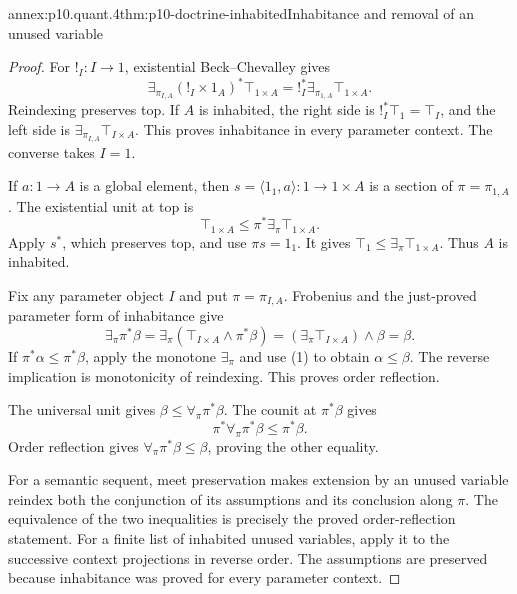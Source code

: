 \begin{annexitem}{annex:p10.quant.4}{thm:p10-doctrine-inhabited}{Inhabitance and removal of an unused variable}
\begin{proof}
For \(!_I:I\to1\), existential Beck--Chevalley gives
\[
 \exists_{\pi_{I,A}}(!_I\times1_A)^*\top_{1\times A}
       =!_I^*\exists_{\pi_{1,A}}\top_{1\times A}.
\]
Reindexing preserves top.  If \(A\) is inhabited, the
right side is \(!_I^*\top_1=\top_I\), and the left side
is \(\exists_{\pi_{I,A}}\top_{I\times A}\).
This proves inhabitance in every parameter context.
The converse takes \(I=1\).

If \(a:1\to A\) is a global element, then
\(s=\langle1_1,a\rangle:1\to1\times A\) is a section of
\(\pi=\pi_{1,A}\).
The existential unit at top is
\[
                    \top_{1\times A}\leq
                         \pi^*\exists_\pi\top_{1\times A}.
\]
Apply \(s^*\), which preserves top, and use \(\pi s=1_1\).
It gives
\(\top_1\leq\exists_\pi\top_{1\times A}\).
Thus \(A\) is inhabited.

Fix any parameter object \(I\) and put \(\pi=\pi_{I,A}\).
Frobenius and the just-proved parameter form of inhabitance give
\[
 \exists_\pi\pi^*\beta
    =\exists_\pi(\top_{I\times A}\wedge\pi^*\beta)
    =(\exists_\pi\top_{I\times A})\wedge\beta
    =\beta.
                                                                  \tag{1}
\]
If \(\pi^*\alpha\leq\pi^*\beta\), apply the monotone
\(\exists_\pi\) and use (1) to obtain \(\alpha\leq\beta\).
The reverse implication is monotonicity of reindexing.
This proves order reflection.

The universal unit gives \(\beta\leq\forall_\pi\pi^*\beta\).
The counit at \(\pi^*\beta\) gives
\[
                  \pi^*\forall_\pi\pi^*\beta\leq\pi^*\beta.
\]
Order reflection gives
\(\forall_\pi\pi^*\beta\leq\beta\), proving the other equality.

For a semantic sequent, meet preservation makes extension by an
unused variable reindex both the conjunction of its assumptions
and its conclusion along \(\pi\).
The equivalence of the two inequalities is precisely the
proved order-reflection statement.
For a finite list of inhabited unused variables, apply it to
the successive context projections in reverse order.
The assumptions are preserved because inhabitance was proved
for every parameter context.
\end{proof}
\end{annexitem}
